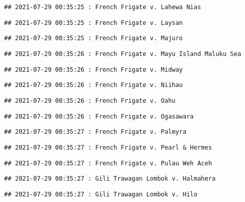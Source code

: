 \documentclass[
]{article}
\begin{document}
\begin{verbatim}
## 2021-07-29 00:35:25 : French Frigate v. Lahewa Nias
\end{verbatim}

\begin{verbatim}
## 2021-07-29 00:35:25 : French Frigate v. Laysan
\end{verbatim}

\begin{verbatim}
## 2021-07-29 00:35:25 : French Frigate v. Majuro
\end{verbatim}

\begin{verbatim}
## 2021-07-29 00:35:26 : French Frigate v. Mayu Island Maluku Sea
\end{verbatim}

\begin{verbatim}
## 2021-07-29 00:35:26 : French Frigate v. Midway
\end{verbatim}

\begin{verbatim}
## 2021-07-29 00:35:26 : French Frigate v. Niihau
\end{verbatim}

\begin{verbatim}
## 2021-07-29 00:35:26 : French Frigate v. Oahu
\end{verbatim}

\begin{verbatim}
## 2021-07-29 00:35:26 : French Frigate v. Ogasawara
\end{verbatim}

\begin{verbatim}
## 2021-07-29 00:35:27 : French Frigate v. Palmyra
\end{verbatim}

\begin{verbatim}
## 2021-07-29 00:35:27 : French Frigate v. Pearl & Hermes
\end{verbatim}

\begin{verbatim}
## 2021-07-29 00:35:27 : French Frigate v. Pulau Weh Aceh
\end{verbatim}

\begin{verbatim}
## 2021-07-29 00:35:27 : Gili Trawagan Lombok v. Halmahera
\end{verbatim}

\begin{verbatim}
## 2021-07-29 00:35:27 : Gili Trawagan Lombok v. Hilo
\end{verbatim}
\end{document}
